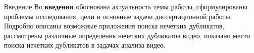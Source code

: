 \documentclass{.local/lib/classes/ndvr-super-article-standalone}
\begin{document}
    \begin{content-item}{Введение}
        Во \textbf{введении} обоснована актуальность темы работы, 
        сформулированы проблемы исследования, 
        цели и основные задачи диссертационной работы.
        Подробно описаны возможные приложения поиска 
        нечетких дубликатов, 
        рассмотрены различные определения 
        нечетких дубликатов видео,
        показано место поиска нечетких дубликатов
        в задачах анализа видео.
    \end{content-item}
\end{document}
